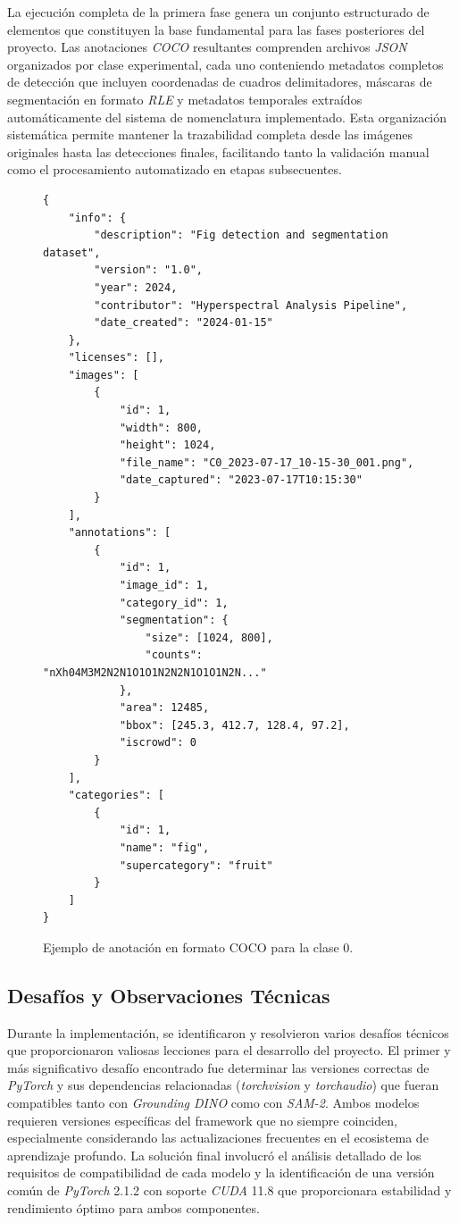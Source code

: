 La ejecución completa de la primera fase genera un conjunto estructurado de elementos que constituyen la base fundamental para las fases posteriores del proyecto. Las anotaciones \emph{COCO} resultantes comprenden archivos \emph{JSON} organizados por clase experimental, cada uno conteniendo metadatos completos de detección que incluyen coordenadas de cuadros delimitadores, máscaras de segmentación en formato \emph{RLE} y metadatos temporales extraídos automáticamente del sistema de nomenclatura implementado. Esta organización sistemática permite mantener la trazabilidad completa desde las imágenes originales hasta las detecciones finales, facilitando tanto la validación manual como el procesamiento automatizado en etapas subsecuentes.

\begin{figure}[H]
\centering
\small
\begin{verbatim}
{
    "info": {
        "description": "Fig detection and segmentation dataset",
        "version": "1.0",
        "year": 2024,
        "contributor": "Hyperspectral Analysis Pipeline",
        "date_created": "2024-01-15"
    },
    "licenses": [],
    "images": [
        {
            "id": 1,
            "width": 800,
            "height": 1024,
            "file_name": "C0_2023-07-17_10-15-30_001.png",
            "date_captured": "2023-07-17T10:15:30"
        }
    ],
    "annotations": [
        {
            "id": 1,
            "image_id": 1,
            "category_id": 1,
            "segmentation": {
                "size": [1024, 800],
                "counts": "nXh04M3M2N2N1O1O1N2N2N1O1O1N2N..."
            },
            "area": 12485,
            "bbox": [245.3, 412.7, 128.4, 97.2],
            "iscrowd": 0
        }
    ],
    "categories": [
        {
            "id": 1,
            "name": "fig",
            "supercategory": "fruit"
        }
    ]
}
\end{verbatim}
\caption{Ejemplo de anotación en formato COCO para la clase 0.}
\end{figure}

\subsection{Desafíos y Observaciones Técnicas}

Durante la implementación, se identificaron y resolvieron varios desafíos técnicos que proporcionaron valiosas lecciones para el desarrollo del proyecto. El primer y más significativo desafío encontrado fue determinar las versiones correctas de \emph{PyTorch} y sus dependencias relacionadas (\emph{torchvision} y \emph{torchaudio}) que fueran compatibles tanto con \emph{Grounding DINO} como con \emph{SAM-2}. Ambos modelos requieren versiones específicas del framework que no siempre coinciden, especialmente considerando las actualizaciones frecuentes en el ecosistema de aprendizaje profundo. La solución final involucró el análisis detallado de los requisitos de compatibilidad de cada modelo y la identificación de una versión común de \emph{PyTorch} 2.1.2 con soporte \emph{CUDA} 11.8 que proporcionara estabilidad y rendimiento óptimo para ambos componentes.

